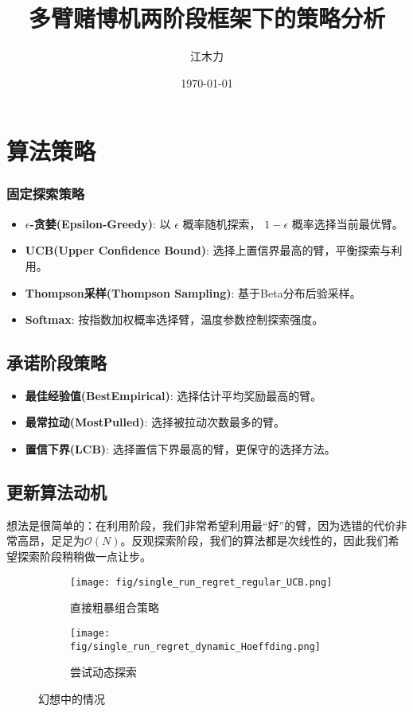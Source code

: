 \documentclass[8pt, a4paper]{ctexart} %
\title{多臂赌博机两阶段框架下的策略分析}
\author{江木力}
\date{\today}
\newcommand{\eps}{\ensuremath{\epsilon}} %
\begin{document}
\maketitle

\section{算法策略}
\subsubsection{固定探索策略}
\begin{itemize}
    \item \textbf{$\eps$-贪婪(Epsilon-Greedy)}: 以 $\eps$ 概率随机探索， $1-\eps$ 概率选择当前最优臂。
    \item \textbf{UCB(Upper Confidence Bound)}: 选择上置信界最高的臂，平衡探索与利用。
    \item \textbf{Thompson采样(Thompson Sampling)}: 基于Beta分布后验采样。
    \item \textbf{Softmax}: 按指数加权概率选择臂，温度参数控制探索强度。
\end{itemize}
\subsection{承诺阶段策略}
\begin{itemize}
    \item \textbf{最佳经验值(BestEmpirical)}: 选择估计平均奖励最高的臂。
    \item \textbf{最常拉动(MostPulled)}: 选择被拉动次数最多的臂。
    \item \textbf{置信下界(LCB)}: 选择置信下界最高的臂，更保守的选择方法。
\end{itemize}
\subsection{更新算法动机}
想法是很简单的：在利用阶段，我们非常希望利用最“好”的臂，因为选错的代价非常高昂，足足为$\mathcal{O}(N)$。反观探索阶段，我们的算法都是次线性的，因此我们希望探索阶段稍稍做一点让步。

\begin{figure}[htbp]
    \centering
    \begin{subfigure}[b]{0.48\textwidth}
        \texttt{[image: fig/single\_run\_regret\_regular\_UCB.png]}
        \caption{直接粗暴组合策略}
        \label{fig:image1}
    \end{subfigure}
    \hfill
    \begin{subfigure}[b]{0.48\textwidth}
        \texttt{[image: fig/single\_run\_regret\_dynamic\_Hoeffding.png]}
        \caption{尝试动态探索}
        \label{fig:image2}
    \end{subfigure}
    \caption{幻想中的情况}
    \label{fig:both_images}
\end{figure}
\end{document}
